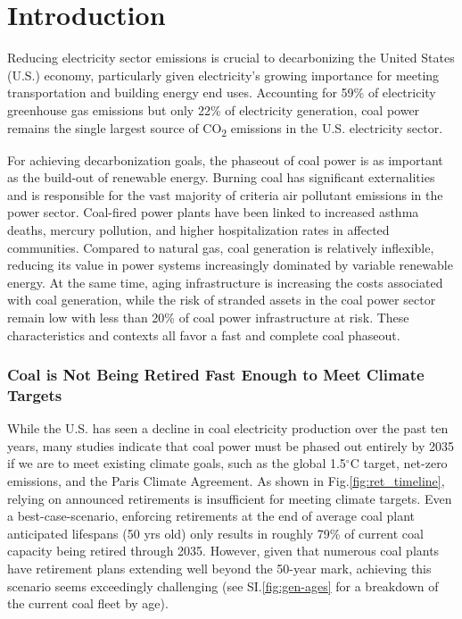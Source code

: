 \setlength{\parindent}{20pt}



\section{Introduction}


Reducing electricity sector emissions is crucial to decarbonizing the United States (U.S.) economy, particularly given electricity's growing importance for meeting transportation and building energy end uses. Accounting for 59\% of electricity greenhouse gas emissions but only 22\% of electricity generation, coal power remains the single largest source of CO\textsubscript{2} emissions in the U.S. electricity sector.

For achieving decarbonization goals, the phaseout of coal power is as important as the build-out of renewable energy.
Burning coal has significant externalities and is responsible for the vast majority of criteria air pollutant emissions in the power sector.
Coal-fired power plants have been linked to increased asthma deaths, mercury pollution, and higher hospitalization rates in affected communities.
Compared to natural gas, coal generation is relatively inflexible, reducing its value in power systems increasingly dominated by variable renewable energy. At the same time, aging infrastructure is increasing the costs associated with coal generation, while
the risk of stranded assets in the coal power sector remain low with less than 20\% of coal power infrastructure at risk.
These characteristics and contexts all favor a fast and complete coal phaseout. 

\subsubsection*{Coal is Not Being Retired Fast Enough to Meet Climate Targets}
While the U.S. has seen a decline in coal electricity production over the past ten years, many studies indicate that coal power must be phased out entirely by 2035 if we are to meet existing climate goals, such as the global 1.5$^\circ$C target,
net-zero emissions, 
and the Paris Climate Agreement. As shown in Fig.\ref{fig:ret_timeline}, relying on announced retirements is insufficient for meeting climate targets.
Even a best-case-scenario, enforcing retirements at the end of average coal plant anticipated lifespans (50 yrs old) only results in roughly 79\% of current coal capacity being retired through 2035. 
However, given that numerous coal plants have retirement plans extending well beyond the 50-year mark, achieving this scenario seems exceedingly challenging (see SI.\ref{fig:gen-ages} for a breakdown of the current coal fleet by age). 

